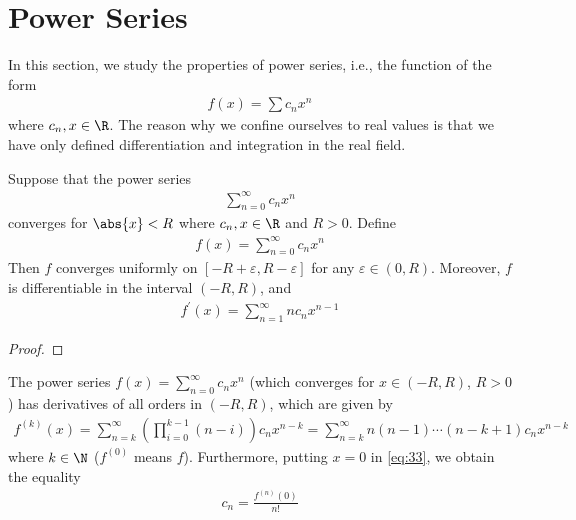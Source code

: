\documentclass[thmcnt=section, 12pt]{elegantbook}
\begin{document}

\section{Power Series}

\par In this section, we study the properties of power series, i.e., the function of the form 
\begin{align*}
    f(x) = \sum c_n x^n
\end{align*}
where $c_n, x \in \R$. The reason why we confine ourselves to real values is that we have only defined differentiation and integration in the real field.


\begin{theorem} \label{thm:18}
    Suppose that the power series 
    \begin{align*}
        \sum_{n=0}^{\infty} c_n x^n
    \end{align*}
    converges for $\abs{x} < R$ where $c_n, x \in \R$ and $R > 0$. Define 
    \begin{align*}
        f(x) = \sum_{n=0}^{\infty} c_n x^n
    \end{align*}
    Then $f$ converges uniformly on $[-R + \varepsilon, R - \varepsilon]$ for any $\varepsilon \in (0, R)$. Moreover, $f$ is differentiable in the interval $(-R, R)$, and 
    \begin{align*}
        f^\prime(x) = \sum_{n=1}^{\infty} n c_n x^{n-1}
    \end{align*}
\end{theorem}

\begin{proof}
\end{proof}


\begin{corollary} \label{cor:2}
    The power series $f(x) = \sum_{n=0}^\infty c_n x^n$ (which converges for $x \in (-R, R)$, $R > 0$) has derivatives of all orders in $(-R, R)$, which are given by 
    \begin{align}
        f^{(k)}(x)
        = \sum_{n=k}^\infty \left( \prod_{i=0}^{k-1}(n-i)\right) c_n x^{n-k}
        = \sum_{n=k}^\infty n(n-1) \cdots (n-k+1) c_n x^{n-k}
        \label{eq:33}
    \end{align}
    where $k \in \N$ ($f^{(0)}$ means $f$). Furthermore, putting $x = 0$ in \eqref{eq:33}, we obtain the equality
    \begin{align}
        c_n = \frac{f^{(n)}(0)}{n!}
        \label{eq:34}
    \end{align}
\end{corollary}
\end{document}
